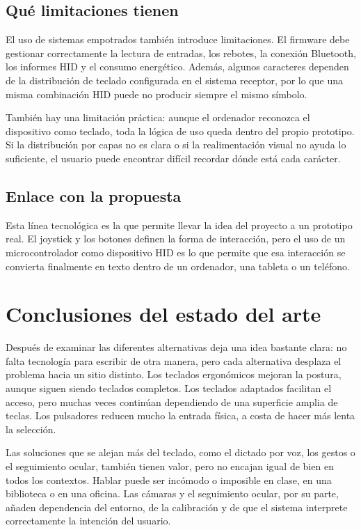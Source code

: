 \subsection{Qué limitaciones tienen}

El uso de sistemas empotrados también introduce limitaciones. El firmware debe gestionar correctamente la lectura de entradas, los rebotes, la conexión Bluetooth, los informes HID y el consumo energético. Además, algunos caracteres dependen de la distribución de teclado configurada en el sistema receptor, por lo que una misma combinación HID puede no producir siempre el mismo símbolo.

También hay una limitación práctica: aunque el ordenador reconozca el dispositivo como teclado, toda la lógica de uso queda dentro del propio prototipo. Si la distribución por capas no es clara o si la realimentación visual no ayuda lo suficiente, el usuario puede encontrar difícil recordar dónde está cada carácter.

\subsection{Enlace con la propuesta}

Esta línea tecnológica es la que permite llevar la idea del proyecto a un prototipo real. El joystick y los botones definen la forma de interacción, pero el uso de un microcontrolador como dispositivo HID es lo que permite que esa interacción se convierta finalmente en texto dentro de un ordenador, una tableta o un teléfono.

\section{Conclusiones del estado del arte}
\label{sec:conclusiones-estado-arte}

Después de examinar las diferentes alternativas deja una idea bastante clara: no falta tecnología para escribir de otra manera, pero cada alternativa desplaza el problema hacia un sitio distinto. Los teclados ergonómicos mejoran la postura, aunque siguen siendo teclados completos. Los teclados adaptados facilitan el acceso, pero muchas veces continúan dependiendo de una superficie amplia de teclas. Los pulsadores reducen mucho la entrada física, a costa de hacer más lenta la selección.

Las soluciones que se alejan más del teclado, como el dictado por voz, los gestos o el seguimiento ocular, también tienen valor, pero no encajan igual de bien en todos los contextos. Hablar puede ser incómodo o imposible en clase, en una biblioteca o en una oficina. Las cámaras y el seguimiento ocular, por su parte, añaden dependencia del entorno, de la calibración y de que el sistema interprete correctamente la intención del usuario.


